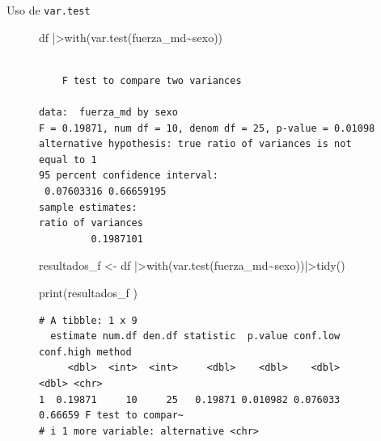 \documentclass[
  ignorenonframetext,
]{beamer}
\newenvironment{Shaded}{\begin{snugshade}}{\end{snugshade}}
\newcommand{\FunctionTok}[1]{\textcolor[rgb]{0.28,0.35,0.67}{#1}}
\newcommand{\NormalTok}[1]{\textcolor[rgb]{0.00,0.23,0.31}{#1}}
\newcommand{\OtherTok}[1]{\textcolor[rgb]{0.00,0.23,0.31}{#1}}
\newcommand{\SpecialCharTok}[1]{\textcolor[rgb]{0.37,0.37,0.37}{#1}}
\begin{document}
\begin{frame}[fragile]{Uso de \texttt{var.test}}
\label{uso-de-var.test}
\begin{figure}

\begin{Shaded}
\begin{Highlighting}[]
\NormalTok{df }\SpecialCharTok{|\textgreater{}}\FunctionTok{with}\NormalTok{(}\FunctionTok{var.test}\NormalTok{(fuerza\_md}\SpecialCharTok{\textasciitilde{}}\NormalTok{sexo)) }
\end{Highlighting}
\end{Shaded}

\begin{verbatim}

    F test to compare two variances

data:  fuerza_md by sexo
F = 0.19871, num df = 10, denom df = 25, p-value = 0.01098
alternative hypothesis: true ratio of variances is not equal to 1
95 percent confidence interval:
 0.07603316 0.66659195
sample estimates:
ratio of variances 
         0.1987101 
\end{verbatim}

\end{figure}%

\begin{figure}

\begin{Shaded}
\begin{Highlighting}[]
\NormalTok{resultados\_f }\OtherTok{\textless{}{-}}\NormalTok{ df }\SpecialCharTok{|\textgreater{}}\FunctionTok{with}\NormalTok{(}\FunctionTok{var.test}\NormalTok{(fuerza\_md}\SpecialCharTok{\textasciitilde{}}\NormalTok{sexo))}\SpecialCharTok{|\textgreater{}}\FunctionTok{tidy}\NormalTok{()}
\end{Highlighting}
\end{Shaded}

\end{figure}%

\begin{figure}

\begin{Shaded}
\begin{Highlighting}[]
\FunctionTok{print}\NormalTok{(resultados\_f ) }
\end{Highlighting}
\end{Shaded}

\begin{verbatim}
# A tibble: 1 x 9
  estimate num.df den.df statistic  p.value conf.low conf.high method           
     <dbl>  <int>  <int>     <dbl>    <dbl>    <dbl>     <dbl> <chr>            
1  0.19871     10     25   0.19871 0.010982 0.076033   0.66659 F test to compar~
# i 1 more variable: alternative <chr>
\end{verbatim}

\end{figure}%
\end{frame}
\end{document}
